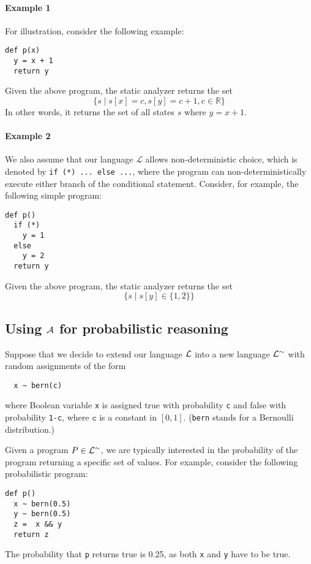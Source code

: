 \documentclass[11pt, oneside]{article}   	%
\newcommand{\lang}{\mathcal{L}}
\begin{document}
\paragraph{Example 1}
For illustration, consider the following example:
%
\begin{verbatim}
def p(x)
  y = x + 1
  return y
\end{verbatim}
%
Given the above program, the static analyzer returns
the set
$$\{s \mid s[x] = c, s[y] = c + 1, c \in \mathbb{R}\}$$
In other words, it returns the set of all states $s$ where $y = x + 1$.

\paragraph{Example 2}
We also assume that our language $\lang$ allows non-deterministic
choice, which is denoted by \texttt{if (*) ... else ...},
where the program can non-deterministically execute either branch of the
conditional statement.
Consider, for example, the following simple program:
\begin{verbatim}
def p()
  if (*)
    y = 1
  else
    y = 2
  return y
\end{verbatim}
Given the above program, the static analyzer returns the set
$$\{ s \mid s[y] \in \{1,2\}\}$$


\subsection{Using $\mathcal{A}$ for probabilistic reasoning}
\label{sec:proba}

Suppose that we decide to extend our language
$\mathcal{L}$ into a new language $\mathcal{L}^\sim$ with random assignments of the form
\begin{verbatim}
  x ~ bern(c)
\end{verbatim}
where Boolean variable \texttt{x} is assigned true with probability \texttt{c}
and false with probability \texttt{1-c}, where $\texttt{c}$ is a constant in $ [0,1]$.
(\texttt{bern} stands for a Bernoulli distribution.)

Given a program $P \in \mathcal{L}^\sim$, we are typically
interested in the probability of the program returning
a specific set of values.
For example, consider the following probabilistic program:
\begin{verbatim}
def p()
  x ~ bern(0.5)
  y ~ bern(0.5)
  z =  x && y
  return z
\end{verbatim}
The probability that \texttt{p} returns true
is 0.25, as both \texttt{x} and \texttt{y} have to be true.
\end{document}
